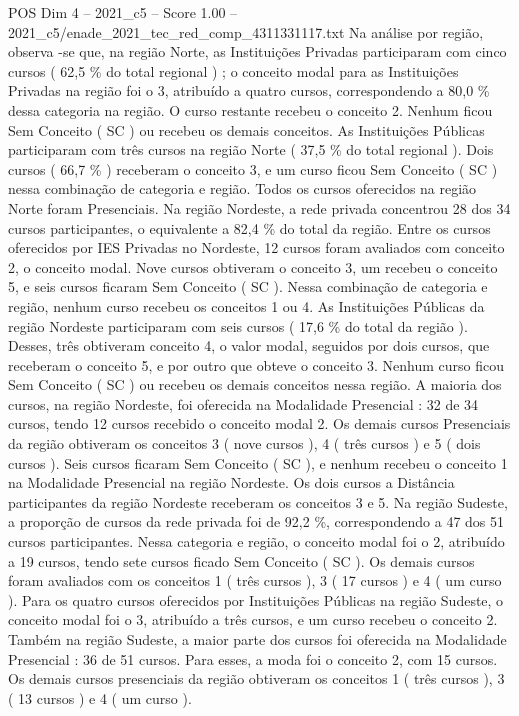 \begin{textsample}{POS Dim 4 – 2021\_c5 – Score 1.00 – 2021\_c5/enade\_2021\_tec\_red\_comp\_4311331117.txt}
Na análise por região, observa -se que, na região Norte, as Instituições Privadas participaram com cinco cursos ( 62,5 \% do total regional ) ; o conceito modal para as Instituições Privadas na região foi o 3, atribuído a quatro cursos, correspondendo a 80,0 \% dessa categoria na região.
O curso restante recebeu o conceito 2.
Nenhum ficou Sem Conceito ( SC ) ou recebeu os demais conceitos.
As Instituições Públicas participaram com três cursos na região Norte ( 37,5 \% do total regional ).
Dois cursos ( 66,7 \% ) receberam o conceito 3, e um curso ficou Sem Conceito ( SC ) nessa combinação de categoria e região.
Todos os cursos oferecidos na região Norte foram Presenciais.
Na região Nordeste, a rede privada concentrou 28 dos 34 cursos participantes, o equivalente a 82,4 \% do total da região.
Entre os cursos oferecidos por IES Privadas no Nordeste, 12 cursos foram avaliados com conceito 2, o conceito modal.
Nove cursos obtiveram o conceito 3, um recebeu o conceito 5, e seis cursos ficaram Sem Conceito ( SC ).
Nessa combinação de categoria e região, nenhum curso recebeu os conceitos 1 ou 4.
As Instituições Públicas da região Nordeste participaram com seis cursos ( 17,6 \% do total da região ).
Desses, três obtiveram conceito 4, o valor modal, seguidos por dois cursos, que receberam o conceito 5, e por outro que obteve o conceito 3.
Nenhum curso ficou Sem Conceito ( SC ) ou recebeu os demais conceitos nessa região.
A maioria dos cursos, na região Nordeste, foi oferecida na Modalidade Presencial : 32 de 34 cursos, tendo 12 cursos recebido o conceito modal 2.
Os demais cursos Presenciais da região obtiveram os conceitos 3 ( nove cursos ), 4 ( três cursos ) e 5 ( dois cursos ).
Seis cursos ficaram Sem Conceito ( SC ), e nenhum recebeu o conceito 1 na Modalidade Presencial na região Nordeste.
Os dois cursos a Distância participantes da região Nordeste receberam os conceitos 3 e 5.
Na região Sudeste, a proporção de cursos da rede privada foi de 92,2 \%, correspondendo a 47 dos 51 cursos participantes.
Nessa categoria e região, o conceito modal foi o 2, atribuído a 19 cursos, tendo sete cursos ficado Sem Conceito ( SC ).
Os demais cursos foram avaliados com os conceitos 1 ( três cursos ), 3 ( 17 cursos ) e 4 ( um curso ).
Para os quatro cursos oferecidos por Instituições Públicas na região Sudeste, o conceito modal foi o 3, atribuído a três cursos, e um curso recebeu o conceito 2.
Também na região Sudeste, a maior parte dos cursos foi oferecida na Modalidade Presencial : 36 de 51 cursos.
Para esses, a moda foi o conceito 2, com 15 cursos.
Os demais cursos presenciais da região obtiveram os conceitos 1 ( três cursos ), 3 ( 13 cursos ) e 4 ( um curso ).

\end{textsample}
